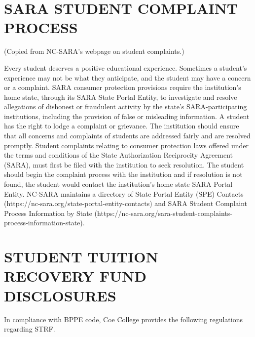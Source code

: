 \documentclass[
  letterpaper,
]{scrbook}
\begin{document}
\section{SARA STUDENT COMPLAINT
PROCESS}\label{sara-student-complaint-process}

(Copied from NC-SARA's webpage on student complaints.)

Every student deserves a positive educational experience. Sometimes a
student's experience may not be what they anticipate, and the student
may have a concern or a complaint. SARA consumer protection provisions
require the institution's home state, through its SARA State Portal
Entity, to investigate and resolve allegations of dishonest or
fraudulent activity by the state's SARA-participating institutions,
including the provision of false or misleading information. A student
has the right to lodge a complaint or grievance. The institution should
ensure that all concerns and complaints of students are addressed fairly
and are resolved promptly. Student complaints relating to consumer
protection laws offered under the terms and conditions of the State
Authorization Reciprocity Agreement (SARA), must first be filed with the
institution to seek resolution. The student should begin the complaint
process with the institution and if resolution is not found, the student
would contact the institution's home state SARA Portal Entity. NC-SARA
maintains a directory of State Portal Entity (SPE) Contacts
(https://nc-sara.org/state-portal-entity-contacts) and SARA Student
Complaint Process Information by State
(https://nc-sara.org/sara-student-complaints-process-information-state).

\section{STUDENT TUITION RECOVERY FUND
DISCLOSURES}\label{student-tuition-recovery-fund-disclosures}

In compliance with BPPE code, Coe College provides the following
regulations regarding STRF.
\end{document}
